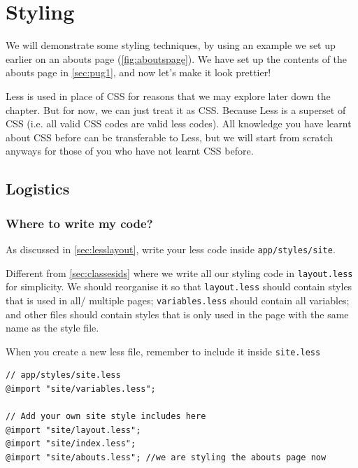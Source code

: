 \chapter{Styling}
\label{sec:styling}

We will demonstrate some styling techniques, by using an example we set up earlier on an abouts page (\cref{fig:aboutspage}). We have set up the contents of the abouts page in \cref{sec:pug1}, and now let's make it look prettier!
\vspace{6mm}

Less is used in place of CSS for reasons that we may explore later down the chapter. But for now, we can just treat it as CSS. Because Less is a superset of CSS (i.e. all valid CSS codes are valid less codes). All knowledge you have learnt about CSS before can be transferable to Less, but we will start from scratch anyways for those of you who have not learnt CSS before.


\section{Logistics}

\subsection*{Where to write my code?}

As discussed in \cref{sec:lesslayout}, write your less code inside \texttt{app/styles/site}. 
\vspace{6mm}

Different from \cref{sec:classesids} where we write all our styling code in \texttt{layout.less} for simplicity. We should reorganise it so that \texttt{layout.less} should contain styles that is used in all/ multiple pages; \texttt{variables.less} should contain all variables; and other files should contain styles that is only used in the page with the same name as the style file.

When you create a new less file, remember to include it inside \texttt{site.less}

\begin{lstlisting}
// app/styles/site.less
@import "site/variables.less";

// Add your own site style includes here
@import "site/layout.less";
@import "site/index.less";
@import "site/abouts.less"; //we are styling the abouts page now
\end{lstlisting}

